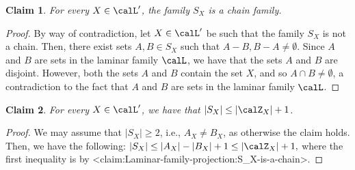 \documentclass{article}
\def\Cref#1{<#1>}%
\newtheorem{claim}{Claim}[section]
\begin{document}
\begin{claim}\label{claim:Laminar-family-projection:S_X-is-a-chain}
        For every $X \in\calL'$, the family $S_X$ is a chain family.
    \end{claim}
    \begin{proof}
        By way of contradiction, let $X \in \calL'$ be such that the family $S_X$ is not a chain. Then, there exist sets $A, B \in S_X$ such that $A - B, B - A \not = \emptyset$. Since $A$ and $B$ are sets in the laminar family $\calL$, we have that the sets $A$ and $B$ are disjoint. However, both the sets $A$ and $B$ contain the set $X$, and so $A\cap B \not = \emptyset$, a contradiction to the fact that $A$ and $B$ are sets in the laminar family $\calL$.
    \end{proof}

\begin{claim}\label{claim:Laminar-family-projection:|S_X|-atmost-|Z_X|+1}
    For every $X \in \calL'$, we have that $|S_X| \leq |\calZ_{X}| + 1$.
\end{claim}
\begin{proof}
    We may assume that $|S_X| \geq 2$, i.e.,  $A_X \not = B_X$, as otherwise the claim holds. Then, we have the following:
    $|S_X| \leq |A_X| - |B_X| + 1 \leq |\calZ_X| +1,$ where the first inequality is by \Cref{claim:Laminar-family-projection:S_X-is-a-chain}.
\end{proof}
\end{document}

